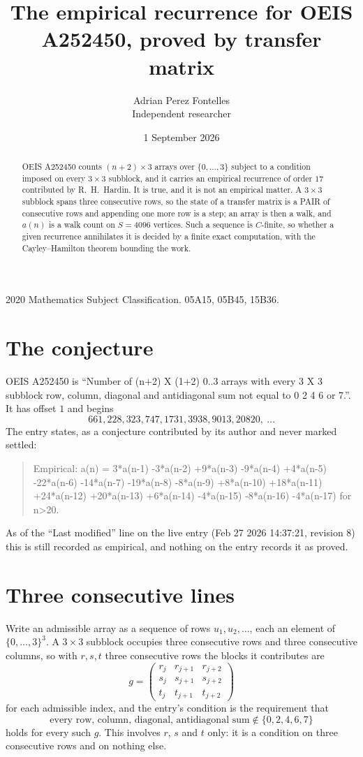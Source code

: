 \documentclass[11pt,a4paper]{article}
\title{The empirical recurrence for OEIS A252450, proved by transfer matrix}
\author{Adrian Perez Fontelles\\ \small Independent researcher}
\date{1 September 2026}
\theoremstyle{plain}
\theoremstyle{definition}
\begin{document}
\maketitle

\begin{abstract}
OEIS A252450 counts $(n+2)\times3$ arrays over $\{0,\dots,3\}$ subject to a condition imposed on
every $3\times3$ subblock, and it carries an empirical recurrence of order $17$
contributed by R.~H.~Hardin. It is true, and it is not an empirical matter. A $3\times3$
subblock spans three consecutive rows, so the state of a transfer matrix is a PAIR of
consecutive rows and appending one more row is a step; an array is then a walk, and
$a(n)$ is a walk count on $S=4096$ vertices. Such a sequence is $C$-finite, so whether a given
recurrence annihilates it is decided by a finite exact computation, with the Cayley--Hamilton
theorem bounding the work.
\end{abstract}

\noindent\small 2020 Mathematics Subject Classification. 05A15, 05B45, 15B36.\normalsize

\section{The conjecture}

OEIS A252450 is ``Number of (n+2) X (1+2) 0..3 arrays with every 3 X 3 subblock row, column, diagonal and antidiagonal sum not equal to 0 2 4 6 or 7.''. It has offset $1$ and begins
\[
661, 228, 323, 747, 1731, 3938, 9013, 20820,\ \dots
\]
The entry states, as a conjecture contributed by its author and never marked settled:
\begin{quote}
Empirical: a(n) = 3*a(n-1) -3*a(n-2) +9*a(n-3) -9*a(n-4) +4*a(n-5) -22*a(n-6) -14*a(n-7) -19*a(n-8) -8*a(n-9) +8*a(n-10) +18*a(n-11) +24*a(n-12) +20*a(n-13) +6*a(n-14) -4*a(n-15) -8*a(n-16) -4*a(n-17) for n>20.
\end{quote}
As of the ``Last modified'' line on the live entry (Feb 27 2026 14:37:21, revision 8) this is still
recorded as empirical, and nothing on the entry records it as proved.

\section{Three consecutive lines}

Write an admissible array as a sequence of rows $u_1,u_2,\dots$, each an element of
$\{0,\dots,3\}^{3}$. A $3\times3$ subblock occupies three consecutive rows and
three consecutive columns, so with $r,s,t$ three consecutive rows the blocks it
contributes are
\[
g=\begin{pmatrix}r_j&r_{j+1}&r_{j+2}\\ s_j&s_{j+1}&s_{j+2}\\ t_j&t_{j+1}&t_{j+2}\end{pmatrix}
\]
for each admissible index, and the entry's condition is the requirement that
\[
\text{every row, column, diagonal, antidiagonal sum} \notin \{0,2,4,6,7\}
\]
holds for every such $g$. This involves $r$, $s$ and $t$ only: it is a condition on
three consecutive rows and on nothing else.
\end{document}
